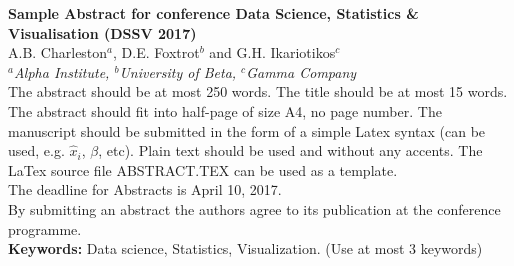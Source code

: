 
\setlength{\textwidth}{160mm}\setlength{\textheight}{240mm}
\setlength{\oddsidemargin}{0mm}\setlength{\evensidemargin}{0mm}
\setlength{\topmargin}{-10mm}
\setlength{\parindent}{0mm} 
\pagestyle{empty}	%


{\large\bf Sample Abstract for conference Data Science, Statistics \& Visualisation (DSSV 2017) }\\[4mm]

A.B. Charleston$^a$, D.E. Foxtrot$^b$ and G.H. Ikariotikos$^c$\\ 				

{\small \em $^a$Alpha Institute, $^b$University of Beta, $^c$Gamma 
Company}\\[3mm]


The abstract should be at most 250 words. The title should be at most 15 words.
The abstract should fit into half-page of size A4, no page number. The manuscript should be submitted in the 
form of a simple Latex syntax (can be used, e.g. $\hat{x}_i$, $\beta$, etc). Plain text should be used and without any accents. The LaTex source file ABSTRACT.TEX can be used as a 
template.\\


The deadline for Abstracts is April 10, 2017.\\

By submitting an abstract the authors agree to its publication at 
the conference programme.\\


\textbf{Keywords:} Data science, Statistics, Visualization. (Use at most 3 keywords)


